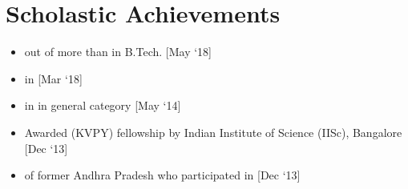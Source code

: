 \documentclass[a4paper,10pt]{article}
\newcommand{\duration}[1]{\hfill[#1]}
\begin{document}
\section{Scholastic Achievements}
\begin{itemize}
	\item {} out of more than  in B.Tech. \duration{May `18}
	\item {} in  \duration{Mar `18}
	\item {} in  in general category \duration{May `14}
	\item Awarded  (KVPY) fellowship by Indian Institute of Science (IISc), Bangalore \duration{Dec `13}
	\item {} of former Andhra Pradesh who participated in  \duration{Dec `13}
\end{itemize}
\end{document}
